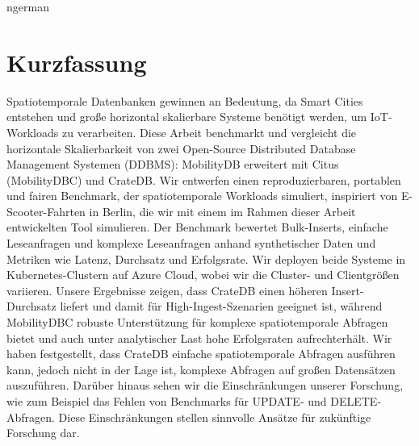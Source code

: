 \documentclass[a4paper, 11pt]{article}
\begin{document}
\clearpage
\begin{otherlanguage}
  {ngerman}
  \section*{Kurzfassung}
  Spatiotemporale Datenbanken gewinnen an Bedeutung, da Smart Cities entstehen und große horizontal skalierbare Systeme benötigt werden, um IoT-Workloads zu verarbeiten.
  Diese Arbeit benchmarkt und vergleicht die horizontale Skalierbarkeit von zwei Open-Source Distributed Database Management Systemen (DDBMS): MobilityDB erweitert mit Citus (MobilityDBC) und CrateDB.
  Wir entwerfen einen reproduzierbaren, portablen und fairen Benchmark, der spatiotemporale Workloads simuliert, inspiriert von E-Scooter-Fahrten in Berlin, die wir mit einem im Rahmen dieser Arbeit entwickelten Tool simulieren.
  Der Benchmark bewertet Bulk-Inserts, einfache Leseanfragen und komplexe Leseanfragen anhand synthetischer Daten und Metriken wie Latenz, Durchsatz und Erfolgsrate.
  Wir deployen beide Systeme in Kubernetes-Clustern auf Azure Cloud, wobei wir die Cluster- und Clientgrößen variieren.
  Unsere Ergebnisse zeigen, dass CrateDB einen höheren Insert-Durchsatz liefert und damit für High-Ingest-Szenarien geeignet ist, während MobilityDBC robuste Unterstützung für komplexe spatiotemporale Abfragen bietet und auch unter analytischer Last hohe Erfolgsraten aufrechterhält.
  Wir haben festgestellt, dass CrateDB einfache spatiotemporale Abfragen ausführen kann, jedoch nicht in der Lage ist, komplexe Abfragen auf großen Datensätzen auszuführen.
  Darüber hinaus sehen wir die Einschränkungen unserer Forschung, wie zum Beispiel das Fehlen von Benchmarks für UPDATE- und DELETE-Abfragen.
  Diese Einschränkungen stellen sinnvolle Ansätze für zukünftige Forschung dar.
\end{otherlanguage}

\clearpage

\tableofcontents


\clearpage

\clearpage

\clearpage

\clearpage

\clearpage

\clearpage


\newpage
\printbibliography
\end{document}
